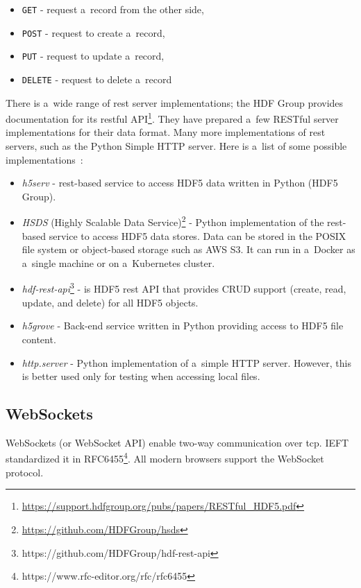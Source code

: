 \begin{itemize}
    \item \texttt{GET} - request a~record from the other side,
    \item \texttt{POST} - request to create a~record,
    \item \texttt{PUT} - request to update a~record,
    \item \texttt{DELETE} - request to delete a~record~\cite{restapi}
\end{itemize}


There is a~wide range of \ac{rest} server implementations; the HDF Group provides documentation for its \ac{rest}ful API\footnote{\url{https://support.hdfgroup.org/pubs/papers/RESTful\_HDF5.pdf}}. They have prepared a~few RESTful server implementations for their data format. Many more implementations of \ac{rest} servers, such as the Python Simple HTTP server. Here is a~list of some possible implementations~\cite{hdfrest}:

\begin{itemize}
    \item \emph{h5serv} - \ac{rest}-based service to access HDF5 data written in Python (HDF5 Group).
    \item \emph{HSDS} (Highly Scalable Data Service)\footnote{\url{https://github.com/HDFGroup/hsds}} - Python implementation of the \ac{rest}-based service to access HDF5 data stores. Data can be stored in the POSIX file system or object-based storage such as AWS S3. It can run in a~Docker as a~single machine or on a~Kubernetes cluster.
    \item \emph{hdf-rest-api}\footnote{https://github.com/HDFGroup/hdf-rest-api} - is HDF5 \ac{rest} API that provides CRUD support (create, read, update, and delete) for all HDF5 objects.
    \item \emph{h5grove} - Back-end service written in Python providing access to HDF5 file content.
    \item \emph{http.server} - Python implementation of a~simple HTTP server. However, this is better used only for testing when accessing local files.
\end{itemize}


\subsection{WebSockets}\label{txt.design.websocket}

WebSockets (or WebSocket API) enable two-way communication over \ac{tcp}. IEFT standardized it in RFC6455\footnote{https://www.rfc-editor.org/rfc/rfc6455}. All modern browsers support the WebSocket protocol.

